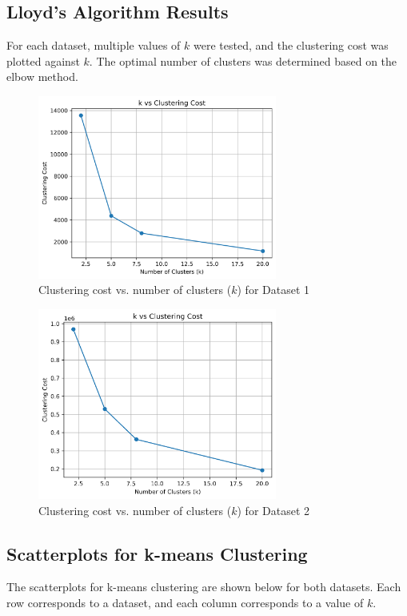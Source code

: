 \documentclass{article}
\begin{document}
\subsection{Lloyd’s Algorithm Results}
For each dataset, multiple values of $k$ were tested, and the clustering cost was plotted against $k$. The optimal number of clusters was determined based on the elbow method.

\begin{figure}[h]
    \centering
    \includegraphics[width=0.7\textwidth]{figures/k_vs_cost0.png} %
    \caption{Clustering cost vs. number of clusters ($k$) for Dataset 1}
    \label{fig:cost_plot1}
\end{figure}

\begin{figure}[h]
    \centering
    \includegraphics[width=0.7\textwidth]{figures/k_vs_cost1.png} %
    \caption{Clustering cost vs. number of clusters ($k$) for Dataset 2}
    \label{fig:cost_plot2}
\end{figure}

\subsection{Scatterplots for k-means Clustering}
The scatterplots for k-means clustering are shown below for both datasets. Each row corresponds to a dataset, and each column corresponds to a value of $k$.
\end{document}
